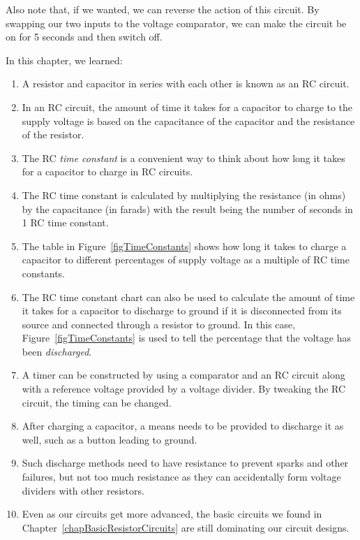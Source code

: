 Also note that, if we wanted, we can reverse the action of this circuit.  
By swapping our two inputs to the voltage comparator, we can make the circuit be on for 5 seconds and then switch off.

\reviewsection

In this chapter, we learned:

\begin{enumerate}
\item A resistor and capacitor in series with each other is known as an RC circuit.
\item In an RC circuit, the amount of time it takes for a capacitor to charge to the supply voltage is based on the capacitance of the capacitor and the resistance of the resistor.
\item The RC \emph{time constant} is a convenient way to think about how long it takes for a capacitor to charge in RC circuits.
\item The RC time constant is calculated by multiplying the resistance (in ohms) by the capacitance (in farads) with the result being the number of seconds in 1 RC time constant.
\item The table in Figure~\ref{figTimeConstants} shows how long it takes to charge a capacitor to different percentages of supply voltage as a multiple of RC time constants.
\item The RC time constant chart can also be used to calculate the amount of time it takes for a capacitor to discharge to ground if it is disconnected from its source and connected through a resistor to ground.  In this case, Figure~\ref{figTimeConstants} is used to tell the percentage that the voltage has been \emph{discharged}.
\item A timer can be constructed by using a comparator and an RC circuit along with a reference voltage provided by a voltage divider.  By tweaking the RC circuit, the timing can be changed.
\item After charging a capacitor, a means needs to be provided to discharge it as well, such as a button leading to ground.
\item Such discharge methods need to have resistance to prevent sparks and other failures, but not too much resistance as they can accidentally form voltage dividers with other resistors.
\item Even as our circuits get more advanced, the basic circuits we found in Chapter~\ref{chapBasicResistorCircuits} are still dominating our circuit designs.
\end{enumerate}

\applysection


